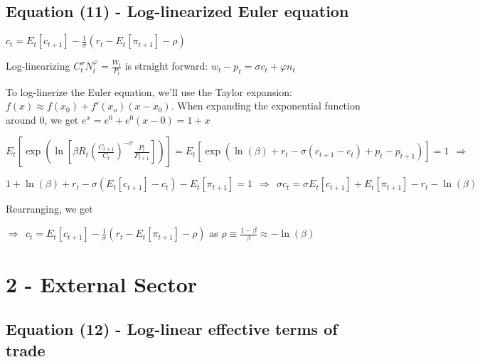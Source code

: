 \documentclass[
]{article}
\begin{document}
\vspace{12pt}

\hypertarget{equation-11---log-linearized-euler-equation}{%
\subsection{Equation (11) - Log-linearized Euler
equation}\label{equation-11---log-linearized-euler-equation}}

\(\displaystyle c_t = E_t \left[c_{t+1} \right] -\frac{1}{\sigma} \left( r_t - E_t \left[ \pi_{t+1} \right] -\rho\right)\)

\vspace{8pt}

Log-linearizing
\(\displaystyle C_t^{\sigma}N_t^{\varphi} = \frac{W_t}{P_t}\) is
straight forward: \(w_t - p_t = \sigma c_t + \varphi n_t\)

To log-linerize the Euler equation, we'll use the Taylor expansion:
\(f(x) \approx f(x_0) + f'(x_o)(x-x_0)\). When expanding the exponential
function around 0, we get \(e^x=e^0+e^0(x-0)=1+x\)

\(E_t \left[ \exp \left( \ln \left[ \beta R_t \left( \frac{C_{t+1}}{C_t} \right)^{-\sigma} \frac{P_t}{P_{t+1}} \right] \right) \right] = E_t \left[ \exp \left( \ln(\beta) + r_t -\sigma(c_{t+1}-c_t) + p_t - p_{t+1} \right) \right] = 1 \ \ \Rightarrow\)

\(\displaystyle 1 + \ln(\beta) + r_t -\sigma(E_t \left[c_{t+1} \right]-c_t) - E_t \left[ \pi_{t+1} \right] = 1 \ \ \Rightarrow \ \ \sigma c_t = \sigma E_t \left[c_{t+1} \right] + E_t \left[ \pi_{t+1} \right] - r_t - \ln(\beta)\)

Rearranging, we get

\(\displaystyle \Rightarrow \ \ c_t = E_t \left[c_{t+1} \right] -\frac{1}{\sigma} \left( r_t - E_t \left[ \pi_{t+1} \right] -\rho\right)\)
as \(\rho \equiv \frac{1-\beta}{\beta} \approx -\ln(\beta)\)

\vspace{12pt}

\hypertarget{external-sector}{%
\section{2 - External Sector}\label{external-sector}}

\hypertarget{equation-12---log-linear-effective-terms-of-trade}{%
\subsection{Equation (12) - Log-linear effective terms of
trade}\label{equation-12---log-linear-effective-terms-of-trade}}
\end{document}
